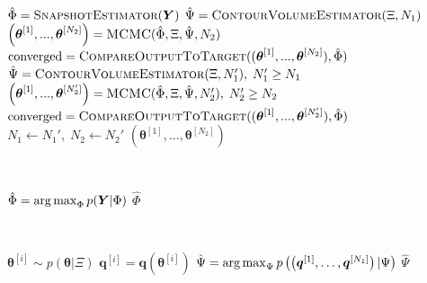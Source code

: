 \begin{algorithm}[H]
\footnotesize
\texttt{\\}
\begin{algorithmic}
	\State $\hat{\Phi} = \Call{SnapshotEstimator}{\boldsymbol{Y}}$
	\State $\hat{\Psi} = \Call{ContourVolumeEstimator}{\Xi,N_1}$
	\State $\left(\boldsymbol{\theta}^{[1]},...,\boldsymbol{\theta}^{[N_2]}\right) = \Call{MCMC}{\hat{\Phi},\Xi, \hat{\Psi},N_2}$
	\State $\text{converged} = \Call{CompareOutputToTarget}{(\boldsymbol{\theta}^{[1]},...,\boldsymbol{\theta}^{[N_2]}), \hat{\Phi}}$
	 
		 \State $\hat{\Psi}=\Call{ContourVolumeEstimator}{\Xi, N_1'},\; N_1' \geq N_1$
         \State $\left( \boldsymbol{\theta}^{[1]},...,\boldsymbol{\theta}^{[N_2']} \right)
                = \Call{MCMC}{\hat{\Phi},\Xi, \hat{\Psi},N_2'}, \; N_2' \geq N_2$
          \State $\text{converged} = \Call{CompareOutputToTarget}{(\boldsymbol{\theta}^{[1]},...,\boldsymbol{\theta}^{[N_2']} ), \hat{\Phi}}$
          \State $N_1 \leftarrow N_1', \; N_2 \leftarrow N_2'$
	\EndWhile
	\State \Return $\left( \boldsymbol{\theta}^{[1]},...,\boldsymbol{\theta}^{[N_2]} \right)$
\EndProcedure
\end{algorithmic}

\texttt{\\}
\begin{algorithmic}
	\State $\hat{\Phi} = \operatorname*{arg\,max}_\Phi p(\boldsymbol{Y}|\Phi)$
	\State \Return $\hat{\Phi}$
\EndProcedure
\end{algorithmic}
	
\texttt{\\}
\begin{algorithmic}
		\State $\boldsymbol{\theta}^{[i]} \sim p(\boldsymbol{\theta}|\Xi)$           
		\State $\boldsymbol{q}^{[i]} = \boldsymbol{q}(\boldsymbol{\theta}^{[i]})$  
	\EndFor
	\State $ \hat{\Psi} = \operatorname*{arg\,max}_\Psi p\left(\left( \boldsymbol{q}^{[1]}, \dots ,\boldsymbol{q}^{[N_1]} \right)|\Psi\right)$
	\State \Return $\hat{\Psi}$
\EndProcedure
\end{algorithmic}


\end{algorithm}
